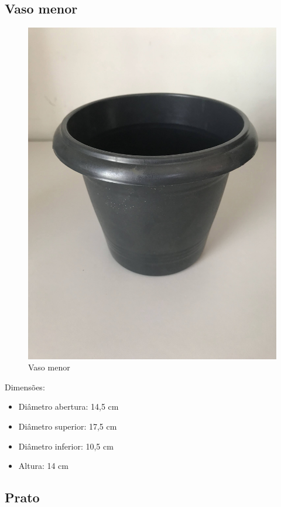 \documentclass[
	12pt,				%
	openright,			%
	oneside,			%
	a4paper,			%
	chapter=TITLE,		%
	english,			%
	brazil				%
	]{abntex2}
\begin{document}
\subsection{Vaso menor}

\begin{figure}[H]
    \centering
    \includegraphics[scale=0.04, angle=-90]{imagens/IMG_0600.jpg}
    \caption{Vaso menor}
    \label{fig:vasomenor}
\end{figure}        
Dimensões: 

\begin{itemize}
    \item Diâmetro abertura: 14,5 cm
    \item Diâmetro superior: 17,5 cm
    \item Diâmetro inferior: 10,5 cm
    \item Altura: 14 cm
\end{itemize}

\subsection{Prato}
\end{document}
